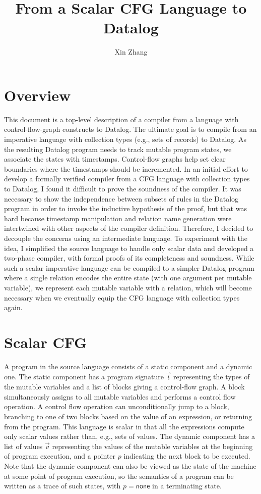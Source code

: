 \documentclass[11pt]{article}
\title{From a Scalar CFG Language to Datalog}
\author{Xin Zhang}
\date{}
\newcommand{\none}{\textsf{none}}
\begin{document}
\maketitle

\tableofcontents

\newpage

\section{Overview}
This document is a top-level description of a compiler from a language with control-flow-graph constructs to Datalog.
The ultimate goal is to compile from an imperative language with collection types (e.g., sets of records) to Datalog.
As the resulting Datalog program needs to track mutable program states, we associate the states with timestamps.
Control-flow graphs help set clear boundaries where the timestamps should be incremented.
In an initial effort to develop a formally verified compiler from a CFG language with collection types to Datalog, I found it difficult to prove the soundness of the compiler.
It was necessary to show the independence between subsets of rules in the Datalog program in order to invoke the inductive hypothesis of the proof, but that was hard because timestamp manipulation and relation name generation were intertwined with other aspects of the compiler definition.
Therefore, I decided to decouple the concerns using an intermediate language.
To experiment with the idea, I simplified the source language to handle only scalar data and developed a two-phase compiler, with formal proofs of its completeness and soundness.
While such a scalar imperative language can be compiled to a simpler Datalog program where a single relation encodes the entire state (with one argument per mutable variable), we represent each mutable variable with a relation, which will become necessary when we eventually equip the CFG language with collection types again.


\section{Scalar CFG}
A program in the source language consists of a static component and a dynamic one.
The static component has a program signature $\vec{t}$ representing the types of the mutable variables and a list of blocks giving a control-flow graph.
A block simultaneously assigns to all mutable variables and performs a control flow operation.
A control flow operation can unconditionally jump to a block, branching to one of two blocks based on the value of an expression, or returning from the program.
This language is scalar in that all the expressions compute only scalar values rather than, e.g., sets of values.
The dynamic component has a list of values $\vec{v}$ representing the values of the mutable variables at the beginning of program execution, and a pointer $p$ indicating the next block to be executed.
Note that the dynamic component can also be viewed as the state of the machine at some point of program execution, so the semantics of a program can be written as a trace of such states, with $p = \none$ in a terminating state.
\end{document}
